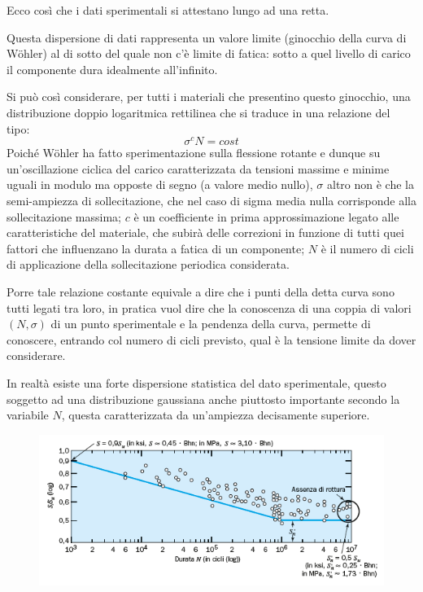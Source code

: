 		Ecco così che i dati sperimentali si attestano lungo ad una retta. 
		
		Questa dispersione di dati rappresenta un valore limite (ginocchio della curva di Wöhler) al di sotto del quale non c'è limite di fatica: sotto a quel livello di carico il componente dura idealmente all'infinito. \newline
		
		Si può così considerare, per tutti i materiali che presentino questo ginocchio, una distribuzione doppio logaritmica  rettilinea che si traduce in una relazione del tipo:
		\[\sigma^cN=cost\]
		Poiché Wöhler ha fatto sperimentazione sulla flessione rotante e dunque su un'oscillazione ciclica del carico caratterizzata da tensioni massime e minime uguali in modulo ma opposte di segno (a valore medio nullo), $\sigma$ altro non è che la semi-ampiezza di sollecitazione, che nel caso di sigma media nulla corrisponde alla sollecitazione massima; $ c $ è un coefficiente in prima approssimazione legato alle caratteristiche del materiale, che subirà delle correzioni in funzione di tutti quei fattori che influenzano la durata a fatica di un componente; $ N $ è il numero di cicli di applicazione della sollecitazione periodica considerata. \newline 
		
		Porre tale relazione costante equivale a dire che i punti della detta curva sono tutti legati tra loro, in pratica vuol dire che la conoscenza di una coppia di valori $(N, \sigma)$ di un punto sperimentale e la pendenza della curva, permette di conoscere, entrando col numero di cicli previsto, qual è la tensione limite da dover considerare. \newline
		
		In realtà esiste una forte dispersione statistica del dato sperimentale, questo soggetto ad una distribuzione gaussiana anche piuttosto importante secondo la variabile $ N $, questa caratterizzata da un'ampiezza decisamente superiore. 
		
		\begin{figure}[H]
			\centering
			\includegraphics[width=0.5\linewidth]{immagini_10/screenshot004}
			\label{fig:screenshot004}
		\end{figure}
		
